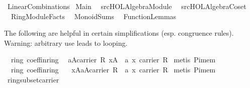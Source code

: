 %
\begin{isabellebody}%
\def\isabellecontext{LinearCombinations}%
%
\isamarkuptrue%
%
\isadelimtheory
%
\endisadelimtheory
%
\isatagtheory
{}\isamarkupfalse%
\ LinearCombinations\isanewline
{}\ Main\isanewline
\ \ {\isachardoublequoteopen}{\isachartilde}{\isachartilde}{\isacharslash}src{\isacharslash}HOL{\isacharslash}Algebra{\isacharslash}Module{\isachardoublequoteclose}\isanewline
\ \ {\isachardoublequoteopen}{\isachartilde}{\isachartilde}{\isacharslash}src{\isacharslash}HOL{\isacharslash}Algebra{\isacharslash}Coset{\isachardoublequoteclose}\isanewline
\ \ RingModuleFacts\isanewline
\ \ MonoidSums\isanewline
\ \ FunctionLemmas\isanewline
{}%
\endisatagtheory
{\isafoldtheory}%
%
\isadelimtheory
%
\endisadelimtheory
%
\isamarkuptrue%
%
\begin{isamarkuptext}%
The following are helpful in certain simplifications (esp. congruence rules). Warning: arbitrary
use leads to looping.%
\end{isamarkuptext}%
\isamarkuptrue%
\isamarkupfalse%
\ {\isacharparenleft}\ ring{\isacharparenright}\ coeff{\isacharunderscore}in{\isacharunderscore}ring{\isacharcolon}\isanewline
\ \ {\isachardoublequoteopen}{\isasymlbrakk}a{\isasymin}A{\isasymrightarrow}carrier\ R{\isacharsemicolon}\ x{\isasymin}A{\isasymrbrakk}\ {\isasymLongrightarrow}\ a\ x\ {\isasymin}carrier\ R{\isachardoublequoteclose}\isanewline
%
\isadelimproof
%
\endisadelimproof
%
\isatagproof
{}\isamarkupfalse%
\ {\isacharparenleft}metis\ Pi{\isacharunderscore}mem{\isacharparenright}%
\endisatagproof
{\isafoldproof}%
%
\isadelimproof
\isanewline
%
\endisadelimproof
\isanewline
\isanewline
{}\isamarkupfalse%
\ {\isacharparenleft}\ ring{\isacharparenright}\ coeff{\isacharunderscore}in{\isacharunderscore}ring{}{\isacharcolon}\isanewline
\ \ {\isachardoublequoteopen}{\isasymlbrakk}\ x{\isasymin}A{\isacharsemicolon}a{\isasymin}A{\isasymrightarrow}carrier\ R{\isasymrbrakk}\ {\isasymLongrightarrow}\ a\ x\ {\isasymin}carrier\ R{\isachardoublequoteclose}\isanewline
%
\isadelimproof
%
\endisadelimproof
%
\isatagproof
{}\isamarkupfalse%
\ {\isacharparenleft}metis\ Pi{\isacharunderscore}mem{\isacharparenright}%
\endisatagproof
{\isafoldproof}%
%
\isadelimproof
\isanewline
%
\endisadelimproof
\isanewline
{}\isamarkupfalse%
\ ring{\isacharunderscore}subset{\isacharunderscore}carrier{\isacharcolon}\isanewline

\end{isabellebody}

